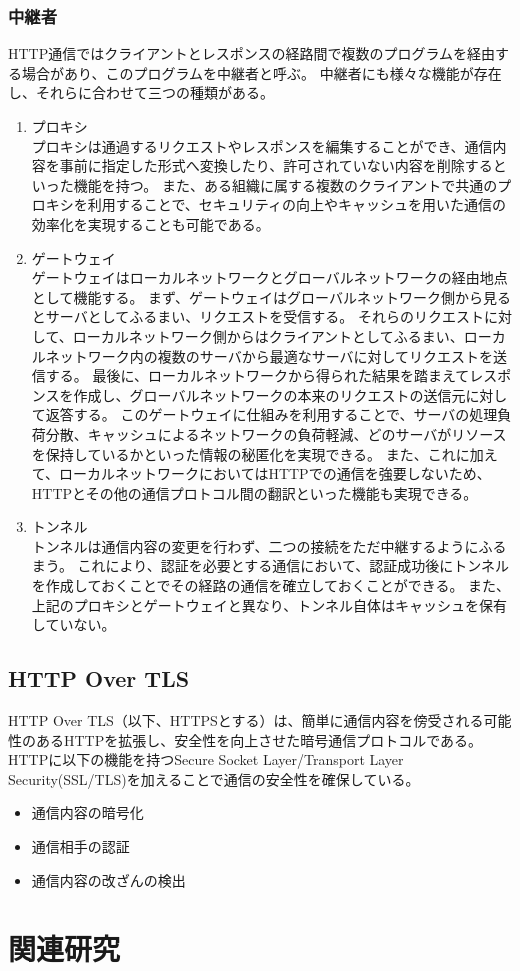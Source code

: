 \documentclass[12pt,a4paper]{jbook}
\begin{document}
\subsubsection{中継者}
\label{sec:intermediary}
HTTP通信ではクライアントとレスポンスの経路間で複数のプログラムを経由する場合があり、このプログラムを中継者と呼ぶ。
中継者にも様々な機能が存在し、それらに合わせて三つの種類がある。
\begin{enumerate}
\item プロキシ\\
プロキシは通過するリクエストやレスポンスを編集することができ、通信内容を事前に指定した形式へ変換したり、許可されていない内容を削除するといった機能を持つ。
また、ある組織に属する複数のクライアントで共通のプロキシを利用することで、セキュリティの向上やキャッシュを用いた通信の効率化を実現することも可能である。
\item ゲートウェイ\\
ゲートウェイはローカルネットワークとグローバルネットワークの経由地点として機能する。
まず、ゲートウェイはグローバルネットワーク側から見るとサーバとしてふるまい、リクエストを受信する。
それらのリクエストに対して、ローカルネットワーク側からはクライアントとしてふるまい、ローカルネットワーク内の複数のサーバから最適なサーバに対してリクエストを送信する。
最後に、ローカルネットワークから得られた結果を踏まえてレスポンスを作成し、グローバルネットワークの本来のリクエストの送信元に対して返答する。
このゲートウェイに仕組みを利用することで、サーバの処理負荷分散、キャッシュによるネットワークの負荷軽減、どのサーバがリソースを保持しているかといった情報の秘匿化を実現できる。
また、これに加えて、ローカルネットワークにおいてはHTTPでの通信を強要しないため、HTTPとその他の通信プロトコル間の翻訳といった機能も実現できる。
\item トンネル\\
トンネルは通信内容の変更を行わず、二つの接続をただ中継するようにふるまう。
これにより、認証を必要とする通信において、認証成功後にトンネルを作成しておくことでその経路の通信を確立しておくことができる。
また、上記のプロキシとゲートウェイと異なり、トンネル自体はキャッシュを保有していない。
\end{enumerate}

\subsection{HTTP Over TLS}
\label{sec:https}
HTTP Over TLS\cite{https}（以下、HTTPSとする）は、簡単に通信内容を傍受される可能性のあるHTTPを拡張し、安全性を向上させた暗号通信プロトコルである。
HTTPに以下の機能を持つSecure Socket Layer/Transport Layer Security(SSL/TLS)を加えることで通信の安全性を確保している。
\begin{itemize}
\item 通信内容の暗号化
\item 通信相手の認証
\item 通信内容の改ざんの検出
\end{itemize}

\section{関連研究}
\end{document}
